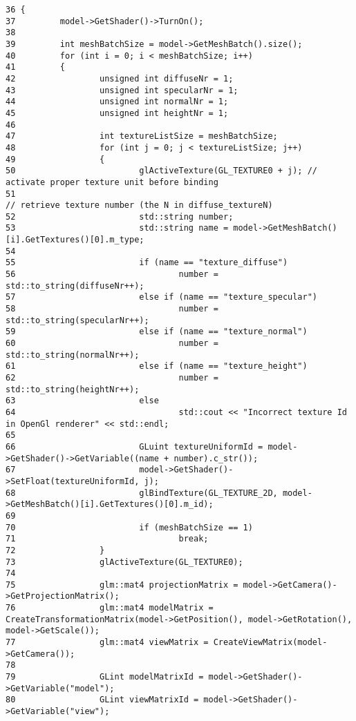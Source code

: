 \begin{Code}\begin{verbatim}36 {
37         model->GetShader()->TurnOn();
38 
39         int meshBatchSize = model->GetMeshBatch().size();
40         for (int i = 0; i < meshBatchSize; i++)
41         {
42                 unsigned int diffuseNr = 1;
43                 unsigned int specularNr = 1;
44                 unsigned int normalNr = 1;
45                 unsigned int heightNr = 1;
46 
47                 int textureListSize = meshBatchSize;
48                 for (int j = 0; j < textureListSize; j++)
49                 {
50                         glActiveTexture(GL_TEXTURE0 + j); // activate proper texture unit before binding
51                                                                                                 // retrieve texture number (the N in diffuse_textureN)
52                         std::string number;
53                         std::string name = model->GetMeshBatch()[i].GetTextures()[0].m_type;
54 
55                         if (name == "texture_diffuse")
56                                 number = std::to_string(diffuseNr++);
57                         else if (name == "texture_specular")
58                                 number = std::to_string(specularNr++);
59                         else if (name == "texture_normal")
60                                 number = std::to_string(normalNr++);
61                         else if (name == "texture_height")
62                                 number = std::to_string(heightNr++);
63                         else
64                                 std::cout << "Incorrect texture Id in OpenGl renderer" << std::endl;
65 
66                         GLuint textureUniformId = model->GetShader()->GetVariable((name + number).c_str());
67                         model->GetShader()->SetFloat(textureUniformId, j);
68                         glBindTexture(GL_TEXTURE_2D, model->GetMeshBatch()[i].GetTextures()[0].m_id);
69 
70                         if (meshBatchSize == 1)
71                                 break;
72                 }
73                 glActiveTexture(GL_TEXTURE0);
74 
75                 glm::mat4 projectionMatrix = model->GetCamera()->GetProjectionMatrix();
76                 glm::mat4 modelMatrix = CreateTransformationMatrix(model->GetPosition(), model->GetRotation(), model->GetScale());
77                 glm::mat4 viewMatrix = CreateViewMatrix(model->GetCamera());
78 
79                 GLint modelMatrixId = model->GetShader()->GetVariable("model");
80                 GLint viewMatrixId = model->GetShader()->GetVariable("view");

\end{verbatim}
\end{Code}
